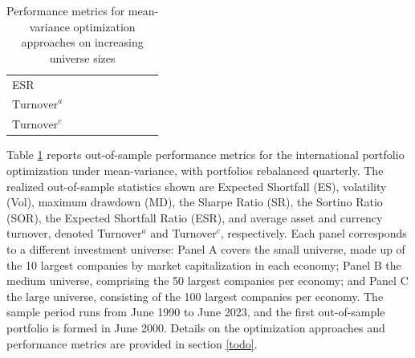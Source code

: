 \begin{table}[htbp]
{\begin{tabular}{lcccccccc}
    ESR  & & \\
    $\text{Turnover}^a$  & & \\
    $\text{Turnover}^c$  & & \\
    \bottomrule
  \end{tabular}%
}
  \caption{Performance metrics for mean-variance optimization approaches on increasing universe sizes}
  \label{tab:mv-universe-sizes}
   \vspace{0.5em}
  \begin{minipage}{\textwidth}
  \raggedright\small
    Table \ref{tab:mv-universe-sizes} reports out-of-sample performance metrics for the international
  portfolio optimization under mean-variance, with portfolios rebalanced
  quarterly. The realized out-of-sample statistics shown are Expected Shortfall (ES), volatility (Vol),
  maximum drawdown (MD), the Sharpe Ratio (SR), the Sortino Ratio (SOR), the Expected Shortfall Ratio (ESR), 
  and average asset and currency turnover, denoted Turnover$^a$ and Turnover$^c$, respectively. 
  Each panel corresponds to a different investment universe:
  Panel A covers the small universe, made up of the 10 largest companies by market
  capitalization in each economy; Panel B the medium universe, comprising the 50 largest
  companies per economy; and Panel C the large universe, consisting of the 100 largest
  companies per economy. The sample period runs from June 1990 to June 2023, and the
  first out-of-sample portfolio is formed in June 2000. Details on the optimization approaches and 
    performance metrics are provided in section \ref{todo}.
  \end{minipage}
\end{table}